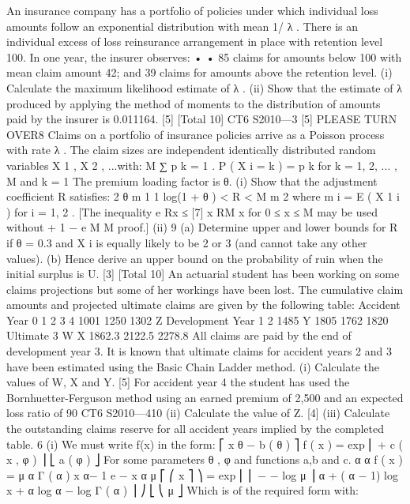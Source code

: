 An insurance company has a portfolio of policies under which individual loss
amounts follow an exponential distribution with mean 1/ λ . There is an individual
excess of loss reinsurance arrangement in place with retention level 100. In one year,
the insurer observes:
•
•
85 claims for amounts below 100 with mean claim amount 42; and
39 claims for amounts above the retention level.
(i) Calculate the maximum likelihood estimate of λ .
(ii) Show that the estimate of λ produced by applying the method of moments to
the distribution of amounts paid by the insurer is 0.011164.
[5]
[Total 10]
CT6 S2010—3
[5]
PLEASE TURN OVER8
Claims on a portfolio of insurance policies arrive as a Poisson process with rate λ .
The claim sizes are independent identically distributed random variables
X 1 , X 2 , ...with:
M
∑ p k = 1 .
P ( X i = k ) = p k for k = 1, 2, ... , M and
k = 1
The premium loading factor is θ.
(i)
Show that the adjustment coefficient R satisfies:
2 θ m 1
1
log(1 + θ ) < R <
M
m 2
where m i = E ( X 1 i ) for i = 1, 2 .
[The inequality e Rx ≤
[7]
x RM
x
for 0 ≤ x ≤ M may be used without
+ 1 −
e
M
M
proof.]
(ii)
9
(a) Determine upper and lower bounds for R if θ = 0.3 and X i is equally
likely to be 2 or 3 (and cannot take any other values).
(b) Hence derive an upper bound on the probability of ruin when the initial
surplus is U.
[3]
[Total 10]
An actuarial student has been working on some claims projections but some of her
workings have been lost. The cumulative claim amounts and projected ultimate
claims are given by the following table:
Accident
Year 0
1
2
3
4 1001
1250
1302
Z
Development Year
1
2
1485
Y
1805
1762
1820
Ultimate
3
W
X
1862.3
2122.5
2278.8
All claims are paid by the end of development year 3.
It is known that ultimate claims for accident years 2 and 3 have been estimated using
the Basic Chain Ladder method.
(i)
Calculate the values of W, X and Y.
[5]
For accident year 4 the student has used the Bornhuetter-Ferguson method using an
earned premium of 2,500 and an expected loss ratio of 90%
CT6 S2010—410
(ii) Calculate the value of Z.
[4]
(iii) Calculate the outstanding claims reserve for all accident years implied by the
completed table.
6
(i)
We must write f(x) in the form:
⎡ x θ − b ( θ )
⎤
f ( x ) = exp ⎢
+ c ( x , φ ) ⎥
⎣ a ( φ )
⎦
For some parameters θ , φ and functions a,b and c.
α α
f ( x ) =
μ α Γ ( α )
x
α− 1
e
−
x α
μ
⎡ ⎛ x
⎤
⎞
= exp ⎢ ⎜ − − log μ ⎟ α + ( α − 1) log x + α log α − log Γ ( α ) ⎥
⎠
⎣ ⎝ μ
⎦
Which is of the required form with:
